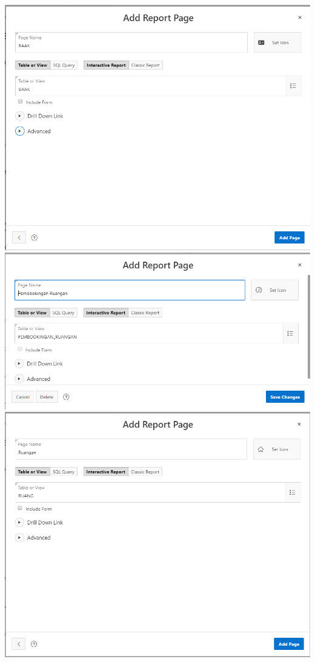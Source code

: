 \documentclass{article}
\begin{document}
\begin{enumerate}
\begin{center}
     \includegraphics[width=.8\textwidth]{Figure/7.PNG}
     \includegraphics[width=.8\textwidth]{Figure/8.PNG}
     \includegraphics[width=.8\textwidth]{Figure/9.PNG}
     \end{center}
     

\end{enumerate}
\end{document}

